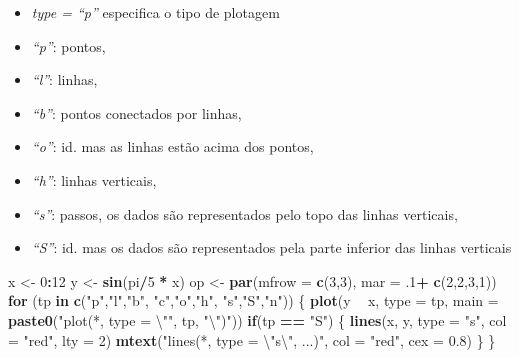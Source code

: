 \documentclass[
]{book}
\newenvironment{Shaded}{\begin{snugshade}}{\end{snugshade}}
\newcommand{\CharTok}[1]{\textcolor[rgb]{0.31,0.60,0.02}{#1}}
\newcommand{\ControlFlowTok}[1]{\textcolor[rgb]{0.13,0.29,0.53}{\textbf{#1}}}
\newcommand{\DataTypeTok}[1]{\textcolor[rgb]{0.13,0.29,0.53}{#1}}
\newcommand{\DecValTok}[1]{\textcolor[rgb]{0.00,0.00,0.81}{#1}}
\newcommand{\FloatTok}[1]{\textcolor[rgb]{0.00,0.00,0.81}{#1}}
\newcommand{\KeywordTok}[1]{\textcolor[rgb]{0.13,0.29,0.53}{\textbf{#1}}}
\newcommand{\NormalTok}[1]{#1}
\newcommand{\OperatorTok}[1]{\textcolor[rgb]{0.81,0.36,0.00}{\textbf{#1}}}
\newcommand{\StringTok}[1]{\textcolor[rgb]{0.31,0.60,0.02}{#1}}
\providecommand{\tightlist}{%
  \setlength{\itemsep}{0pt}\setlength{\parskip}{0pt}}
\begin{document}
\begin{itemize}
\tightlist
\item
  \emph{type = ``p''} especifica o tipo de plotagem
\item
  \emph{``p''}: pontos,
\item
  \emph{``l''}: linhas,
\item
  \emph{``b''}: pontos conectados por linhas,
\item
  \emph{``o''}: id. mas as linhas estão acima dos pontos,
\item
  \emph{``h''}: linhas verticais,
\item
  \emph{``s''}: passos, os dados são representados pelo topo das linhas verticais,
\item
  \emph{``S''}: id. mas os dados são representados pela parte inferior das linhas verticais
\end{itemize}

\begin{Shaded}
\begin{Highlighting}[]
\NormalTok{x <-}\StringTok{ }\DecValTok{0}\OperatorTok{:}\DecValTok{12}
\NormalTok{y <-}\StringTok{ }\KeywordTok{sin}\NormalTok{(pi}\OperatorTok{/}\DecValTok{5} \OperatorTok{*}\StringTok{ }\NormalTok{x)}
\NormalTok{op <-}\StringTok{ }\KeywordTok{par}\NormalTok{(}\DataTypeTok{mfrow =} \KeywordTok{c}\NormalTok{(}\DecValTok{3}\NormalTok{,}\DecValTok{3}\NormalTok{), }\DataTypeTok{mar =} \FloatTok{.1}\OperatorTok{+}\StringTok{ }\KeywordTok{c}\NormalTok{(}\DecValTok{2}\NormalTok{,}\DecValTok{2}\NormalTok{,}\DecValTok{3}\NormalTok{,}\DecValTok{1}\NormalTok{))}
\ControlFlowTok{for}\NormalTok{ (tp }\ControlFlowTok{in} \KeywordTok{c}\NormalTok{(}\StringTok{"p"}\NormalTok{,}\StringTok{"l"}\NormalTok{,}\StringTok{"b"}\NormalTok{,  }\StringTok{"c"}\NormalTok{,}\StringTok{"o"}\NormalTok{,}\StringTok{"h"}\NormalTok{,  }\StringTok{"s"}\NormalTok{,}\StringTok{"S"}\NormalTok{,}\StringTok{"n"}\NormalTok{)) \{}
  \KeywordTok{plot}\NormalTok{(y }\OperatorTok{~}\StringTok{ }\NormalTok{x, }\DataTypeTok{type =}\NormalTok{ tp, }\DataTypeTok{main =} \KeywordTok{paste0}\NormalTok{(}\StringTok{"plot(*, type = }\CharTok{\textbackslash{}"}\StringTok{"}\NormalTok{, tp, }\StringTok{"}\CharTok{\textbackslash{}"}\StringTok{)"}\NormalTok{))}
  \ControlFlowTok{if}\NormalTok{(tp }\OperatorTok{==}\StringTok{ "S"}\NormalTok{) \{}
    \KeywordTok{lines}\NormalTok{(x, y, }\DataTypeTok{type =} \StringTok{"s"}\NormalTok{, }\DataTypeTok{col =} \StringTok{"red"}\NormalTok{, }\DataTypeTok{lty =} \DecValTok{2}\NormalTok{)}
    \KeywordTok{mtext}\NormalTok{(}\StringTok{"lines(*, type = }\CharTok{\textbackslash{}"}\StringTok{s}\CharTok{\textbackslash{}"}\StringTok{, ...)"}\NormalTok{, }\DataTypeTok{col =} \StringTok{"red"}\NormalTok{, }\DataTypeTok{cex =} \FloatTok{0.8}\NormalTok{)}
\NormalTok{  \}}
\NormalTok{\}}
\end{Highlighting}
\end{Shaded}
\end{document}
